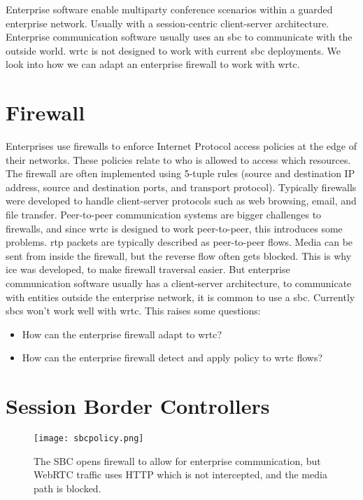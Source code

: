 Enterprise software enable multiparty conference scenarios within a guarded enterprise network. Usually with a session-centric client-server architecture. Enterprise communication software usually uses an \gls{sbc} to communicate with the outside world. \gls{wrtc} is not designed to work with current \gls{sbc} deployments. We look into how we can adapt an enterprise firewall to work with \gls{wrtc}.


\section{Firewall}
Enterprises use firewalls to enforce Internet Protocol access policies at the edge of their networks. These policies relate to who is allowed to access which resources. The firewall are often implemented using 5-tuple rules (source and destination IP address, source and destination ports, and transport protocol). Typically firewalls were developed to handle client-server protocols such as web browsing, email, and file transfer\cite{johnston_taking_2013}. Peer-to-peer communication systems are bigger challenges to firewalls, and since \gls{wrtc} is designed to work peer-to-peer, this introduces some problems. \gls{rtp} packets are typically described as peer-to-peer flows. Media can be sent from inside the firewall, but the reverse flow often gets blocked. This is why \gls{ice} was developed, to make firewall traversal easier. But enterprise communication software usually has a client-server architecture, to communicate with entities outside the enterprise network, it is common to use a \gls{sbc}. Currently \gls{sbc}s won't work well with \gls{wrtc}. This raises some questions:

\begin{itemize}
\item{How can the enterprise firewall adapt to \gls{wrtc}?}
\item{How can the enterprise firewall detect and apply policy to \gls{wrtc} flows?}
\end{itemize}

\section{Session Border Controllers}

\begin{figure}[here]
\centerline{\texttt{[image: sbcpolicy.png]}}
\caption{The SBC opens firewall to allow for enterprise communication, but WebRTC traffic uses HTTP which is not intercepted, and the media path is blocked.}
\label{fig:sbc-policy}
\end{figure}

